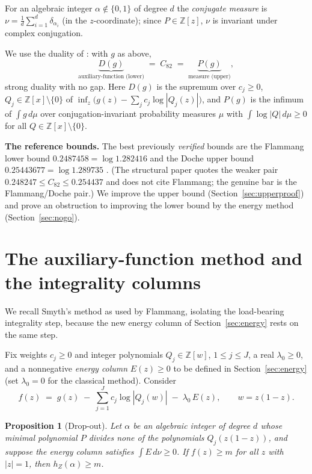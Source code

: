 \documentclass[11pt,reqno]{amsart}
\theoremstyle{plain}
\newtheorem{proposition}[theorem]{Proposition}
\theoremstyle{definition}
\newcommand{\Z}{\mathbb{Z}}
\newcommand{\hZ}{h_Z}
\newcommand{\Cee}{C_{82}}
\newcommand{\dnu}{\,d\nu}
\begin{document}
For an algebraic integer $\alpha\notin\{0,1\}$ of degree $d$ the \emph{conjugate
measure} is $\nu=\frac1d\sum_{i=1}^d\delta_{\alpha_i}$ (in the $z$-coordinate);
since $P\in\Z[z]$, $\nu$ is invariant under complex conjugation.

We use the duality of \citep[Thm.~6.5]{BMQS}: with $g$ as above,
\[
  \underbrace{D(g)}_{\text{auxiliary-function (lower)}}
  \;=\;\Cee\;=\;
  \underbrace{P(g)}_{\text{measure (upper)}},
\]
strong duality with no gap. Here $D(g)$ is the supremum over $c_j\ge0$,
$Q_j\in\Z[x]\setminus\{0\}$ of $\inf_z\bigl(g(z)-\sum_jc_j\log|Q_j(z)|\bigr)$, and
$P(g)$ is the infimum of $\int g\,d\mu$ over conjugation-invariant probability
measures $\mu$ with $\int\log|Q|\,d\mu\ge0$ for all $Q\in\Z[x]\setminus\{0\}$.

\medskip
\noindent\textbf{The reference bounds.}
The best previously \emph{verified} bounds are the Flammang lower bound
$0.2487458=\log 1.282416$ \citep{F18} and the Doche upper bound
$0.25443677=\log1.289735$ \citep{Doc01b}. (The structural paper \citep{BMQS} quotes
the weaker pair $0.248247\le\Cee\le0.254437$ and does not cite Flammang; the
genuine bar is the Flammang/Doche pair.) We improve the upper bound
(Section~\ref{sec:upperproof}) and prove an obstruction to improving the lower
bound by the energy method (Section~\ref{sec:nogo}).

\section{The auxiliary-function method and the integrality columns}\label{sec:aux}

We recall Smyth's method as used by Flammang, isolating the load-bearing
integrality step, because the new energy column of Section~\ref{sec:energy} rests
on the same step.

Fix weights $c_j\ge0$ and integer polynomials $Q_j\in\Z[w]$, $1\le j\le J$, a real
$\lambda_0\ge0$, and a nonnegative \emph{energy column} $E(z)\ge0$ to be defined in
Section~\ref{sec:energy} (set $\lambda_0=0$ for the classical method). Consider
\begin{equation}\label{eq:aux}
  f(z)\;=\;g(z)\;-\;\sum_{j=1}^{J}c_j\log|Q_j(w)|\;-\;\lambda_0\,E(z),
  \qquad w=z(1-z).
\end{equation}

\begin{proposition}[Drop-out]\label{prop:dropout}
Let $\alpha$ be an algebraic integer of degree $d$ whose minimal polynomial $P$
divides none of the polynomials $Q_j(z(1-z))$, and suppose the energy column
satisfies $\int E\dnu\ge0$. If $f(z)\ge m$ for all $z$ with $|z|=1$, then
$\hZ(\alpha)\ge m$.
\end{proposition}
\end{document}
